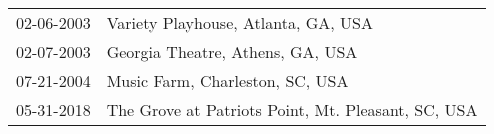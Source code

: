 \begin{supertabular}{ll}
 02-06-2003 &                 Variety Playhouse, Atlanta, GA, USA \\
 02-07-2003 &                    Georgia Theatre, Athens, GA, USA \\
 07-21-2004 &                     Music Farm, Charleston, SC, USA \\
 05-31-2018 &  The Grove at Patriots Point, Mt. Pleasant, SC, USA \\
\end{supertabular}
